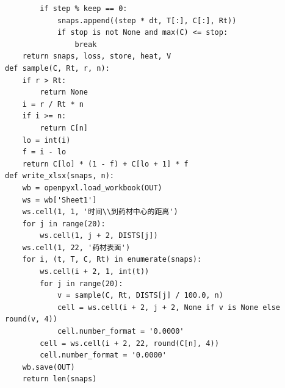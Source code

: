 \documentclass[12pt,a4paper]{article}
\begin{document}
\begin{lstlisting}
        if step % keep == 0:
            snaps.append((step * dt, T[:], C[:], Rt))
            if stop is not None and max(C) <= stop:
                break
    return snaps, loss, store, heat, V
def sample(C, Rt, r, n):
    if r > Rt:
        return None
    i = r / Rt * n
    if i >= n:
        return C[n]
    lo = int(i)
    f = i - lo
    return C[lo] * (1 - f) + C[lo + 1] * f
def write_xlsx(snaps, n):
    wb = openpyxl.load_workbook(OUT)
    ws = wb['Sheet1']
    ws.cell(1, 1, '时间\\到药材中心的距离')
    for j in range(20):                              
        ws.cell(1, j + 2, DISTS[j])
    ws.cell(1, 22, '药材表面')                        
    for i, (t, T, C, Rt) in enumerate(snaps):
        ws.cell(i + 2, 1, int(t))
        for j in range(20):
            v = sample(C, Rt, DISTS[j] / 100.0, n)
            cell = ws.cell(i + 2, j + 2, None if v is None else round(v, 4))
            cell.number_format = '0.0000'
        cell = ws.cell(i + 2, 22, round(C[n], 4))
        cell.number_format = '0.0000'
    wb.save(OUT)
    return len(snaps)


\end{lstlisting}
\end{document}
